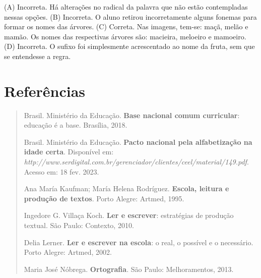 
(A) Incorreta. Há alterações no radical da palavra que não estão contempladas nessas opções.
(B) Incorreta. O aluno retirou incorretamente alguns fonemas para formar
os nomes das árvores.
(C) Correta. Nas imagens, tem-se: maçã, melão e mamão. Os nomes das respectivas árvores são: macieira, meloeiro e mamoeiro.
(D) Incorreta. O sufixo foi simplesmente acrescentado ao nome da fruta, sem que se entendesse a regra.

\chapter{Referências}

\begin{quote}
Brasil. Ministério da Educação. \textbf{Base nacional comum curricular}:
educação é a base. Brasília, 2018.

Brasil. Ministério da Educação. \textbf{Pacto nacional pela
alfabetização na idade certa}. Disponível em:
\emph{http://www.serdigital.com.br/gerenciador/clientes/ceel/material/149.pdf}.
Acesso em: 18 fev. 2023.

Ana María Kaufman; María Helena Rodríguez. \textbf{Escola, leitura e
produção de textos}. Porto Alegre: Artmed, 1995.

Ingedore G. Villaça Koch. \textbf{Ler e escrever}: estratégias de
produção textual. São Paulo: Contexto, 2010.

Delia Lerner. \textbf{Ler e escrever na escola}: o real, o possível e o
necessário. Porto Alegre: Artmed, 2002.

Maria José Nóbrega. \textbf{Ortografia}. São Paulo: Melhoramentos, 2013.
\end{quote}